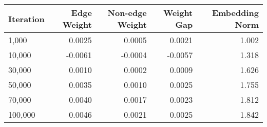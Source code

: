 \begin{tabular}{lrrrr}
\toprule
Iteration & Edge Weight & Non-edge Weight & Weight Gap & Embedding Norm \\
\midrule
    1,000 &      0.0025 &          0.0005 &     0.0021 &          1.002 \\
   10,000 &     -0.0061 &         -0.0004 &    -0.0057 &          1.318 \\
   30,000 &      0.0010 &          0.0002 &     0.0009 &          1.626 \\
   50,000 &      0.0035 &          0.0010 &     0.0025 &          1.755 \\
   70,000 &      0.0040 &          0.0017 &     0.0023 &          1.812 \\
  100,000 &      0.0046 &          0.0021 &     0.0025 &          1.842 \\
\bottomrule
\end{tabular}
